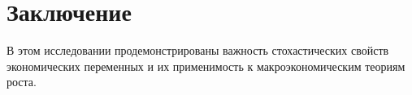 \documentclass[12pt,a4paper, oneside]{extreport}
\begin{document}


%
%

























\newpage







\chapter*{Заключение}



В этом  исследовании  продемонстрированы  важность стохастических свойств экономических переменных  и их применимость к  макроэкономическим  теориям роста.  
\end{document}
